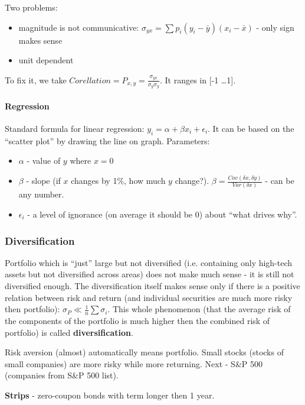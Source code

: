 \documentclass{scrartcl}
\begin{document}
Two problems:
\begin{itemize}
\item magnitude is not communicative: $\sigma_{yx} = \sum p_i (y_i - \bar y)(x_i
  - \bar x)$ - only sign makes sense
\item unit dependent
\end{itemize}
To fix it, we take $Corellation = P_{x, y} = \frac{\sigma_{yx}}{\sigma_y
  \sigma_y}$. It ranges in [-1 \dots 1].

\paragraph{Regression}

Standard formula for linear regression: $y_i = \alpha + \beta x_i + \epsilon_i$.
It can be based on the ``scatter plot'' by drawing the line on graph.
Parameters:
\begin{itemize}
\item $\alpha$ - value of $y$ where $x=0$
\item $\beta$ - slope (if $x$ changes by 1\%, how much $y$ change?). $\beta =
  \frac{Cov(\delta x, \delta y)}{Var(\delta x)}$ - can be any number.
\item $\epsilon_i$ - a level of ignorance (on average it should be 0) about
  ``what drives why''.
\end{itemize}

\subsubsection{Diversification}
\label{sec:Diversification}

Portfolio which is ``just'' large but not diversified (i.e. containing only
high-tech assets but not diversified across areas) does not make much sense - it
is still not diversified enough. The diversification itself makes sense only if
there is a positive relation between risk and return (and individual securities
are much more risky then portfolio): $\sigma_P \ll \frac1n \sum \sigma_i$. This
whole phenomenon (that the average risk of the components of the portfolio is
much higher then the combined risk of portfolio) is called {\bf
  diversification}. 

Risk aversion (almost) automatically means portfolio. Small stocks (stocks of
small companies) are more risky while more returning. Next - S\&P 500 (companies
from S\&P 500 list).

{\bf Strips} - zero-coupon bonds with term longer then 1 year.
\end{document}
